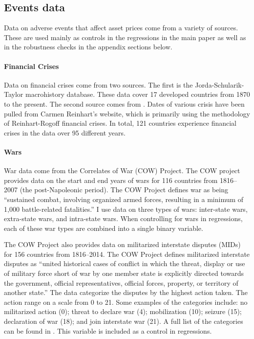 \documentclass[12pt]{article}
\numberwithin{equation}{section}
\begin{document}
\subsection{Events data}\label{section:events_data}

Data on adverse events that affect asset prices come from a variety of sources. These are used mainly as controls in the regressions in the main paper as well as in the robustness checks in the appendix sections below.

\paragraph{Financial Crises}
Data on financial crises come from two sources. The first is the Jorda-Schularik-Taylor macrohistory database. These data cover 17 developed countries from 1870 to the present. The second source comes from \cite{Reinhart2009}. Dates of various crisis have been pulled from Carmen Reinhart’s website, which is primarily using the methodology of Reinhart-Rogoff financial crises. In total, 121 countries experience financial crises in the data over 95 different years.

\paragraph{Wars}
War data come from the Correlates of War (COW) Project. The COW project provides data on the start and end years of wars for 116 countries from 1816--2007 (the post-Napoleonic period). The COW Project defines war as being ``sustained combat, involving organized armed forces, resulting in a minimum of 1,000 battle-related fatalities.''  I use data on three types of wars: inter-state wars, extra-state wars, and intra-state wars.  When controlling for wars in regressions, each of these war types are combined into a single binary variable.

The COW Project also provides data on militarized interstate disputes (MIDs) for 156 countries from 1816--2014. The COW Project defines militarized interstate disputes as ``united historical cases of conflict in which the threat, display or use of military force short of war by one member state is explicitly directed towards the government, official representatives, official forces, property, or territory of another state.''  The data categorize the disputes by the highest action taken. The action range on a scale from 0 to 21. Some examples of the categories include: no militarized action (0); threat to declare war (4); mobilization (10); seizure (15); declaration of war (18); and join interstate war (21). A full list of the categories can be found in \cite{Palmer2020}. This variable is  included as a control in regressions.
\end{document}
